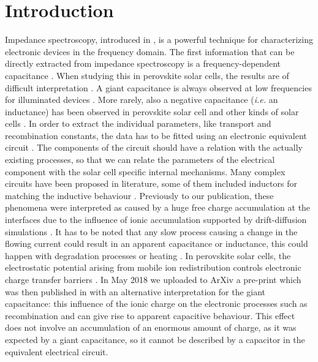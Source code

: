 
\section{Introduction}
Impedance spectroscopy, introduced in , is a powerful technique for characterizing electronic devices in the frequency domain.
The first information that can be directly extracted from impedance spectroscopy is a frequency\hyp{}dependent capacitance \cite{Brus2016}.
When studying this in perovskite solar cells, the results are of difficult interpretation \cite{Almora2018,Guillen2014}.
A giant capacitance is always observed at low frequencies for illuminated devices \cite{Juarez-Perez2014,Kim2015c}.
More rarely, also a negative capacitance (\textsl{i.e.} an inductance) has been observed in perovskite solar cell \cite{Ghahremanirad2017,Guerrero2016,Sanchez2014} and other kinds of solar cells \cite{Mora-Sero2006,Knapp2015}.
In order to extract the individual parameters, like transport and recombination constants, the data has to be fitted using an electronic equivalent circuit \cite{Jamnik2001}.
The components of the circuit should have a relation with the actually existing processes, so that we can relate the parameters of the electrical component with the solar cell specific internal mechanisms.
Many complex circuits have been proposed in literature, some of them included inductors for matching the inductive behaviour \cite{Almora2018,Ghahremanirad2017,Guerrero2016}.
Previously to our publication, these phenomena were interpreted as caused by a huge free charge accumulation at the interfaces due to the influence of ionic accumulation \cite{Guerrero2016,Zarazua2016a} supported by drift\hyp{}diffusion simulations \cite{Garcia-Rosell2018,Lopez-Varo2018}.
It has to be noted that any slow process causing a change in the flowing current could result in an apparent capacitance or inductance, this could happen with degradation processes or heating \cite{Knapp2015}.
In perovskite solar cells, the electrostatic potential arising from mobile ion redistribution controls electronic charge transfer barriers \cite{Tress2016,Pockett2017}.
In May 2018 we uploaded to ArXiv a pre-print which was then published in  with an alternative interpretation for the giant capacitance: this influence of the ionic charge on the electronic processes such as recombination and can give rise to apparent capacitive behaviour.
This effect does not involve an accumulation of an enormous amount of charge, as it was expected by a giant capacitance, so it cannot be described by a capacitor in the equivalent electrical circuit.
